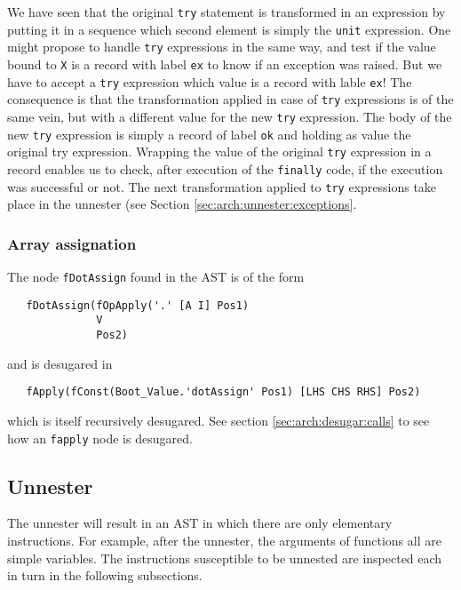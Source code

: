 \documentclass[a4paper]{memoir}
\begin{document}
We have seen that the original \lstinline!try! statement is transformed in an
expression by putting it in a sequence which second element is simply the
\lstinline!unit! expression. One might propose to handle \lstinline!try!
expressions in the same way, and test if the value bound to \lstinline!X! is a
record with label \lstinline!ex! to know if an exception was raised. 
But we have to accept a \lstinline!try! expression which
value is a record with lable \lstinline!ex!! The consequence is that the
transformation applied in case of \lstinline!try! expressions is of the same
vein, but with a different value for the new \lstinline!try! expression.
The body of the new \lstinline!try! expression is simply a record of label
\lstinline!ok! and holding as value the original try expression.
Wrapping the value of the original \lstinline!try! expression in a record
enables us to check, after execution of the \lstinline!finally! code, if the
execution was successful or not.
The next transformation applied to \lstinline!try! expressions take place in 
the unnester (see Section \ref{sec:arch:unnester:exceptions}.

\subsubsection{Array assignation}\label{sec:arch:desugar:dotassign}
The node \lstinline!fDotAssign! found in the AST is of the form 
\begin{lstlisting}
   fDotAssign(fOpApply('.' [A I] Pos1) 
              V 
              Pos2) 
\end{lstlisting}
and is desugared in 
\begin{lstlisting}
   fApply(fConst(Boot_Value.'dotAssign' Pos1) [LHS CHS RHS] Pos2)
\end{lstlisting}
which is itself recursively desugared. See section \ref{sec:arch:desugar:calls}
to see how an \lstinline!fapply! node is desugared.


\subsection{Unnester}\label{sec:arch:unnester}
The unnester will result in an AST in which there are only elementary instructions. For example, after the unnester, the arguments of functions all are simple variables. The instructions susceptible to be unnested are inspected each in turn in the following subsections.
\end{document}
